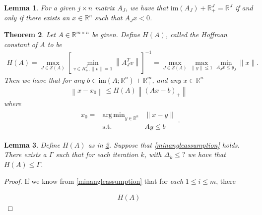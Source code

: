 \documentclass{article}
\newtheorem{theorem}{Theorem}[section]
\newtheorem{lemma}[theorem]{Lemma}
\theoremstyle{case}
\numberwithin{theorem}{subsection}
\DeclareMathOperator*{\argmin}{arg\,min}
\newcommand{\dk}{\Delta_k}
\newcommand{\reals}{\mathbb R}
\newcommand{\Rn}{\mathbb R^n}
\newcommand{\image}{{\textrm{im}}}
\begin{document}
\begin{lemma}
For a given $j \times n$ matrix $A_J$, we have that 
$\image(A_J) + \reals_+^J = \reals^J$
if and only if there exists an $x \in \Rn$ such that
$A_J x < 0$.
\end{lemma}

\begin{theorem}
\label{hoffman_theorem}
Let $A \in \mathbb R^{m \times n}$ be given.
Define $H(A)$, called the Hoffman constant of $A$ to be
\begin{align*}
H(A) = \max_{J \in \mathcal S(A)} \left[\min_{v \in R^J_+, \|v\| = 1}  \left\|A_J^Tv\right\| \right]^{-1}
 = \max_{J \in \mathcal S(A)} \max_{\|y\| \le 1} \min_{A_Jx \le y_J} \|x\|.
\end{align*}
Then we have that for any $b \in \image(A; \Rn) + \reals^m_+$, and any $x \in \Rn$
\begin{align*}
\left\|x - x_0\right\| \le H(A) \left\|\left(Ax - b\right)_+\right\|
\end{align*}
where
\begin{align*}
\begin{array}{ccc}
x_0 = & \argmin_{y \in \Rn} & \|x - y\| \\
      & \textrm{s.t.}    & Ay \le b
\end{array}.
\end{align*}
\end{theorem}


\begin{lemma}
Define $H(A)$ as in \cref{hoffman_theorem}.
Suppose that \cref{minangleassumption} holds.
There exists a $\Gamma$ such that for each iteration $k$,
with $\dk \le ?$ we have that $H(A) \le \Gamma$.
\end{lemma}
\begin{proof}
If we know from \cref{minangleassumption} that for \emph{each} $1 \le i \le m$, there 

\begin{align*}
H(A)
\end{align*}
\end{proof}
\end{document}
